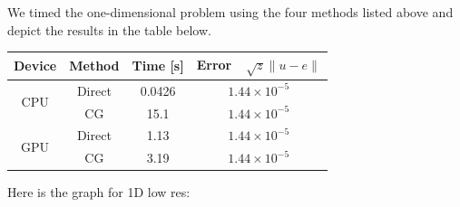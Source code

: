 \documentclass[11pt]{article}
\begin{document}
	We timed the one-dimensional problem using the four methods listed above and depict the results in the table below.
	\begin{center}
		\renewcommand{\arraystretch}{1.5}
		\begin{tabular}{c|c|c|c}
			\hline\hline
			\textbf{Device}&\textbf{Method}&\textbf{Time [s]}&\textbf{Error~~$\sqrt{z}\lVert u-e\rVert $}\\
			\hline
			\multirow{2}{*}{CPU}&Direct&0.0426&$1.44\times 10^{-5}$\\
			&CG&15.1&$1.44\times 10^{-5}$\\
			\hline
			\multirow{2}{*}{GPU}&Direct&1.13&$1.44\times 10^{-5}$\\
			&CG&3.19&$1.44\times 10^{-5}$\\
			\hline
		\end{tabular}
	\end{center}

		Here is the graph for 1D low res:\\
		
		
		
\end{document}
